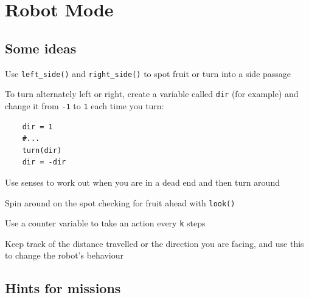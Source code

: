 \documentclass[12pt,a4paper,twoside]{article}
\renewcommand{\_}{\texttt{\symbol{95}}}
\begin{document}
\newpage
\section{Robot Mode}\label{sec:robot-mode}

\subsection{Some ideas}

\begin{bulletlist}
\item Use \verb^left_side()^ and \verb^right_side()^ to spot fruit or turn
	into a side passage
\item To turn alternately left or right, create a variable called \verb^dir^
	(for example) and change it from \verb^-1^ to \verb^1^ each time you turn:
	\begin{verbatim}
	dir = 1
	#...
	turn(dir)
	dir = -dir
	\end{verbatim}
\item Use senses to work out when you are in a dead end and then turn around
\item Spin around on the spot checking for fruit ahead with \verb^look()^
\item Use a counter variable to take an action every \verb^k^ steps
\item Keep track of the distance travelled or the direction you are
	facing, and use this to change the robot's behaviour
\end{bulletlist}

\subsection{Hints for missions}
\end{document}
